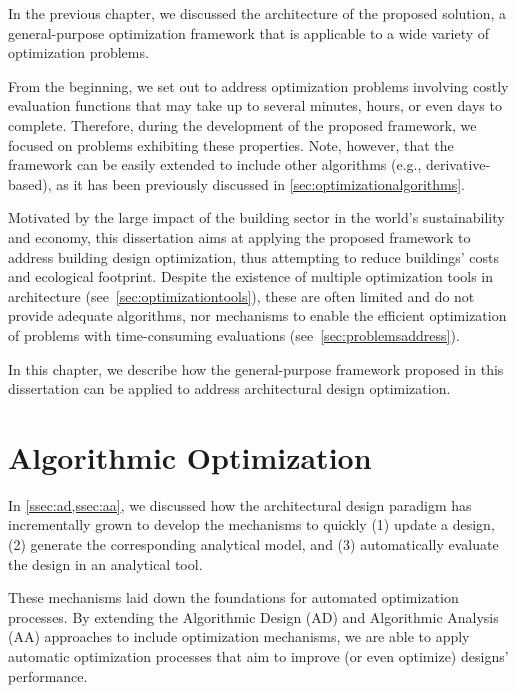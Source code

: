\label{chap:implement}

In the previous chapter, we discussed the architecture of the proposed solution, a general-purpose optimization framework that is applicable to a wide variety of optimization problems. 

From the beginning, we set out to address optimization problems involving costly evaluation functions that may take up to several minutes, hours, or even days to complete. Therefore, during the development of the proposed framework, we focused on problems exhibiting these properties. Note, however, that the framework can be easily extended to include other algorithms (e.g., derivative-based), as it has been previously discussed in \cref{sec:optimizationalgorithms}. 

Motivated by the large impact of the building sector in the world's sustainability and economy, this dissertation aims at applying the proposed framework to address building design optimization, thus attempting to reduce buildings' costs and ecological footprint. Despite the existence of multiple optimization tools in architecture (see~\cref{sec:optimizationtools}), these are often limited and do not provide adequate algorithms, nor mechanisms to enable the efficient optimization of problems with time-consuming evaluations (see~\cref{sec:problemsaddress}).

In this chapter, we describe how the general-purpose framework proposed in this dissertation can be applied to address architectural design optimization. 

\section{Algorithmic Optimization}

In \cref{ssec:ad,ssec:aa}, we discussed how the architectural design paradigm has incrementally grown to develop the mechanisms to quickly (1) update a design, (2) generate the corresponding analytical model, and (3) automatically evaluate the design in an analytical tool.%

These mechanisms laid down the foundations for automated optimization processes. By extending the Algorithmic Design (AD) and Algorithmic Analysis (AA) approaches to include optimization mechanisms, we are able to apply automatic optimization processes that aim to improve (or even optimize) designs' performance. 

